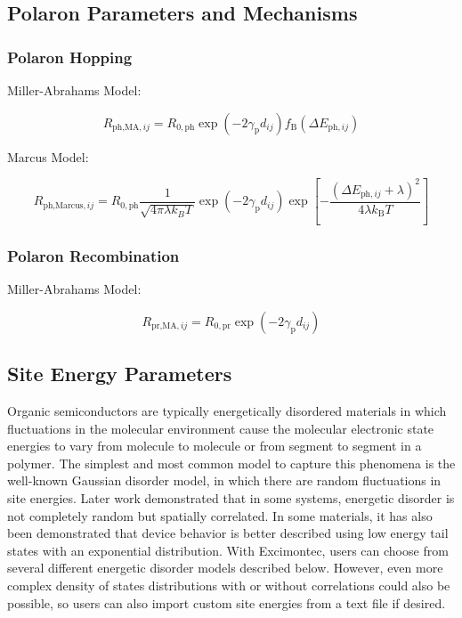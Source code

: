 \documentclass[%
 reprint,onecolumn,notitlepage,
superscriptaddress,longbibliography,
 amsmath,amssymb,
 aps,rmp,floatfix,
]{revtex4-1}
\begin{document}
\subsection{Polaron Parameters and Mechanisms}

\subsubsection{Polaron Hopping}

Miller-Abrahams Model:

$$R_{\text{ph,MA},ij} = R_{0,\text{ph}} \exp{\left(- 2 \gamma_{\text{p}} d_{ij} \right)} f_\text{B} \left( \Delta E_{\text{ph},ij}\right)$$

Marcus Model:

$$R_{\text{ph,Marcus},ij} = R_{0,\text{ph}} \frac{1}{\sqrt{4\pi\lambda k_B T}}\exp{\left(- 2 \gamma_{\text{p}} d_{ij} \right)} \exp{\left[-\frac{(\Delta E_{\text{ph},ij}+\lambda)^2}{4\lambda k_\text{B} T} \right]}$$

\subsubsection{Polaron Recombination}

Miller-Abrahams Model:

$$R_{\text{pr,MA},ij} = R_{0,\text{pr}} \exp{\left(- 2 \gamma_{\text{p}} d_{ij} \right)}$$

\subsection{Site Energy Parameters}

Organic semiconductors are typically energetically disordered materials in which fluctuations in the molecular environment cause the molecular electronic state energies to vary from molecule to molecule or from segment to segment in a polymer.
The simplest and most common model to capture this phenomena is the well-known Gaussian disorder model, in which there are random fluctuations in site energies.\cite{baessler1993pssb}
Later work demonstrated that in some systems, energetic disorder is not completely random but spatially correlated.\cite{gartstein1995cpl,novikov1998prl}
In some materials, it has also been demonstrated that device behavior is better described using low energy tail states with an exponential distribution.\cite{vissenberg1998prb,nelson2003prb,mackenzie2011jpcc}
With Excimontec, users can choose from several different energetic disorder models described below.
However, even more complex density of states distributions with or without correlations could also be possible, so users can also import custom site energies from a text file if desired.
\end{document}
